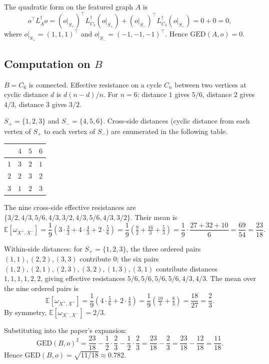 The quadratic form on the featured graph $A$ is
\[
o^\top L_A^\dagger o = (o|_{S_+})^\top L_{C_3}^\dagger (o|_{S_+}) +
(o|_{S_-})^\top L_{C_3}^\dagger (o|_{S_-}) = 0 + 0 = 0,
\]
where $o|_{S_+} = (1, 1, 1)^\top$ and $o|_{S_-} = (-1, -1, -1)^\top$.
Hence $\mathrm{GED}(A, o) = 0$.

\subsection*{Computation on $B$}

$B = C_6$ is connected. Effective resistance on a cycle $C_n$ between
two vertices at cyclic distance $d$ is $d(n - d) / n$. For $n = 6$:
distance $1$ gives $5/6$, distance $2$ gives $4/3$, distance $3$ gives
$3/2$.

$S_+ = \{1, 2, 3\}$ and $S_- = \{4, 5, 6\}$. Cross-side distances
(cyclic distance from each vertex of $S_+$ to each vertex of $S_-$)
are enumerated in the following table.

\begin{center}
\begin{tabular}{c|ccc}
& $4$ & $5$ & $6$ \\
\hline
$1$ & $3$ & $2$ & $1$ \\
$2$ & $2$ & $3$ & $2$ \\
$3$ & $1$ & $2$ & $3$
\end{tabular}
\end{center}

The nine cross-side effective resistances are $\{3/2, 4/3, 5/6, 4/3,
3/2, 4/3, 5/6, 4/3, 3/2\}$. Their mean is
\[
\mathbb{E}[\omega_{X^+, X^-}] = \frac{1}{9}\left(3 \cdot \tfrac{3}{2}
+ 4 \cdot \tfrac{4}{3} + 2 \cdot \tfrac{5}{6}\right) = \frac{1}{9}\left(\tfrac{9}{2} + \tfrac{16}{3} + \tfrac{5}{3}\right)
= \frac{1}{9} \cdot \frac{27 + 32 + 10}{6} = \frac{69}{54} = \frac{23}{18}.
\]

Within-side distances: for $S_+ = \{1, 2, 3\}$, the three ordered
pairs $(1,1), (2,2), (3,3)$ contribute $0$; the six pairs $(1,2),
(2,1), (2,3), (3,2), (1,3), (3,1)$ contribute distances $1, 1, 1, 1,
2, 2$, giving effective resistances $5/6, 5/6, 5/6, 5/6, 4/3, 4/3$.
The mean over the nine ordered pairs is
\[
\mathbb{E}[\omega_{X^+, X^+}] = \frac{1}{9}\left(4 \cdot \tfrac{5}{6} + 2 \cdot \tfrac{4}{3}\right) = \frac{1}{9}\left(\tfrac{10}{3} + \tfrac{8}{3}\right) = \frac{18}{27} = \frac{2}{3}.
\]
By symmetry, $\mathbb{E}[\omega_{X^-, X^-}] = 2/3$.

Substituting into the paper's expansion:
\[
\mathrm{GED}(B, o)^2 = \frac{23}{18} - \frac{1}{2}\cdot\frac{2}{3} -
\frac{1}{2}\cdot\frac{2}{3} = \frac{23}{18} - \frac{2}{3} = \frac{23}{18} - \frac{12}{18} = \frac{11}{18}.
\]
Hence $\mathrm{GED}(B, o) = \sqrt{11/18} \approx 0.782$.

